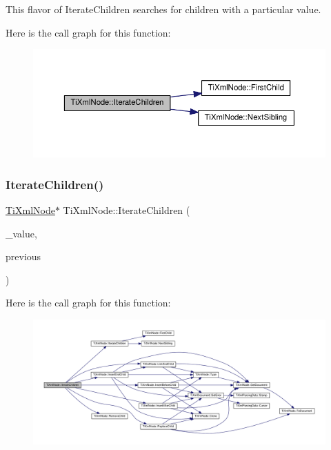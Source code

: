 This flavor of Iterate\+Children searches for children with a particular \textquotesingle{}value\textquotesingle{}. 

Here is the call graph for this function\+:\nopagebreak
\begin{figure}[H]
\begin{center}
\leavevmode
\includegraphics[width=350pt]{class_ti_xml_node_a74bc68a536c279a42af346cb1454f143_cgraph}
\end{center}
\end{figure}
\mbox{\label{class_ti_xml_node_a67ba8275e533e6f76340236c42ea0aea}} 
\subsubsection{\texorpdfstring{Iterate\+Children()}{IterateChildren()}\hspace{0.1cm}{\footnotesize\ttfamily [4/4]}}
{\footnotesize\ttfamily \hyperlink{class_ti_xml_node}{Ti\+Xml\+Node}$\ast$ Ti\+Xml\+Node\+::\+Iterate\+Children (\begin{DoxyParamCaption}\item[{const char $\ast$}]{\+\_\+value,  }\item[{const \hyperlink{class_ti_xml_node}{Ti\+Xml\+Node} $\ast$}]{previous }\end{DoxyParamCaption})\hspace{0.3cm}{\ttfamily [inline]}}

Here is the call graph for this function\+:\nopagebreak
\begin{figure}[H]
\begin{center}
\leavevmode
\includegraphics[width=350pt]{class_ti_xml_node_a67ba8275e533e6f76340236c42ea0aea_cgraph}
\end{center}
\end{figure}
\mbox{\label{class_ti_xml_node_af3a04120b1ed2fead2f4bb72cbea845e}} 
